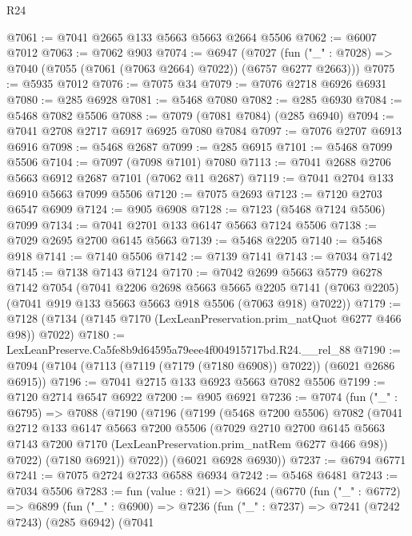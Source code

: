 \begin{lexlean}{R24}
\begin{coremodule}
@7061 := @7041 @2665 @133 @5663 @5663 @2664 @5506
@7062 := @6007 @7012
@7063 := @7062 @903
@7074 := @6947
    (@7027 (fun ("_" : @7028) => @7040 (@7055 (@7061 (@7063 @2664) @7022)) (@6757 @6277 @2663)))
@7075 := @5935 @7012
@7076 := @7075 @34
@7079 := @7076 @2718 @6926 @6931
@7080 := @285 @6928
@7081 := @5468 @7080
@7082 := @285 @6930
@7084 := @5468 @7082 @5506
@7088 := @7079 (@7081 @7084) (@285 @6940)
@7094 := @7041 @2708 @2717 @6917 @6925 @7080 @7084
@7097 := @7076 @2707 @6913 @6916
@7098 := @5468 @2687
@7099 := @285 @6915
@7101 := @5468 @7099 @5506
@7104 := @7097 (@7098 @7101) @7080
@7113 := @7041 @2688 @2706 @5663 @6912 @2687 @7101 (@7062 @11 @2687)
@7119 := @7041 @2704 @133 @6910 @5663 @7099 @5506
@7120 := @7075 @2693
@7123 := @7120 @2703 @6547 @6909
@7124 := @905 @6908
@7128 := @7123 (@5468 @7124 @5506) @7099
@7134 := @7041 @2701 @133 @6147 @5663 @7124 @5506
@7138 := @7029 @2695 @2700 @6145 @5663
@7139 := @5468 @2205
@7140 := @5468 @918
@7141 := @7140 @5506
@7142 := @7139 @7141
@7143 := @7034 @7142
@7145 := @7138 @7143 @7124
@7170 := @7042
    @2699
    @5663
    @5779
    @6278
    @7142
    @7054
    (@7041
      @2206
      @2698
      @5663
      @5665
      @2205
      @7141
      (@7063 @2205)
      (@7041 @919 @133 @5663 @5663 @918 @5506 (@7063 @918) @7022))
@7179 := @7128 (@7134 (@7145 @7170 (LexLeanPreservation.prim_natQuot @6277 @466 @98)) @7022)
@7180 := LexLeanPreserve.Ca5fe8b9d64595a79eee4f004915717bd.R24.__rel_88
@7190 := @7094 (@7104 (@7113 (@7119 (@7179 (@7180 @6908)) @7022)) (@6021 @2686 @6915))
@7196 := @7041 @2715 @133 @6923 @5663 @7082 @5506
@7199 := @7120 @2714 @6547 @6922
@7200 := @905 @6921
@7236 := @7074
    (fun ("_" : @6795) =>
    @7088
      (@7190
        (@7196
          (@7199
            (@5468 @7200 @5506)
            @7082
            (@7041
              @2712
              @133
              @6147
              @5663
              @7200
              @5506
              (@7029
                @2710
                @2700
                @6145
                @5663
                @7143
                @7200
                @7170
                (LexLeanPreservation.prim_natRem @6277 @466 @98))
              @7022)
            (@7180 @6921))
          @7022))
      (@6021 @6928 @6930))
@7237 := @6794 @6771
@7241 := @7075 @2724 @2733 @6588 @6934
@7242 := @5468 @6481
@7243 := @7034 @5506
@7283 := fun (value : @21) =>
  @6624
    (@6770
      (fun ("_" : @6772) =>
      @6899
        (fun ("_" : @6900) =>
        @7236
          (fun ("_" : @7237) =>
          @7241
            (@7242 @7243)
            (@285 @6942)
            (@7041

\end{coremodule}
\end{lexlean}
